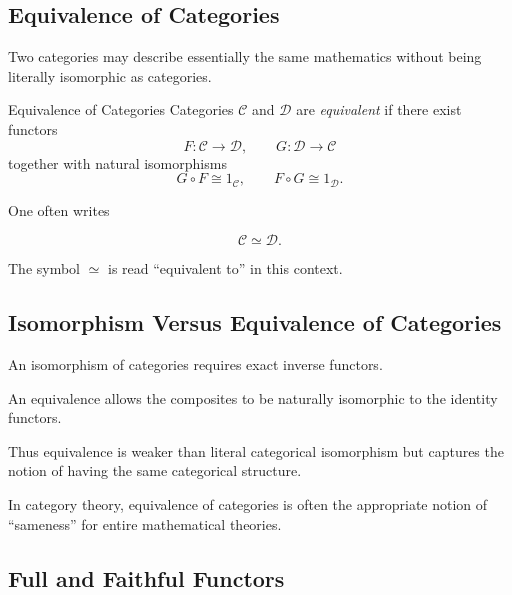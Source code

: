\subsection{Equivalence of Categories}
\label{subsec:equivalence-categories}

Two categories may describe essentially the same mathematics without being
literally isomorphic as categories.

\begin{definitionbox}{Equivalence of Categories}
Categories \(\mathcal C\) and \(\mathcal D\) are \emph{equivalent} if there
exist functors
\[ F:\mathcal C\to\mathcal D,\qquad
G:\mathcal D\to\mathcal C \]
together with natural isomorphisms
\[ G\circ F\cong1_{\mathcal C},\qquad
F\circ G\cong1_{\mathcal D}. \]
\end{definitionbox}

One often writes

\[ \mathcal C\simeq\mathcal D. \]

The symbol \(\simeq\) is read ``equivalent to'' in this context.

\subsection{Isomorphism Versus Equivalence of Categories}
\label{subsec:isomorphism-equivalence-categories}

An isomorphism of categories requires exact inverse functors.

An equivalence allows the composites to be naturally isomorphic to the
identity functors.

Thus equivalence is weaker than literal categorical isomorphism but captures
the notion of having the same categorical structure.

\begin{importantbox}
In category theory, equivalence of categories is often the appropriate
notion of ``sameness'' for entire mathematical theories.
\end{importantbox}

\subsection{Full and Faithful Functors}
\label{subsec:full-faithful}

